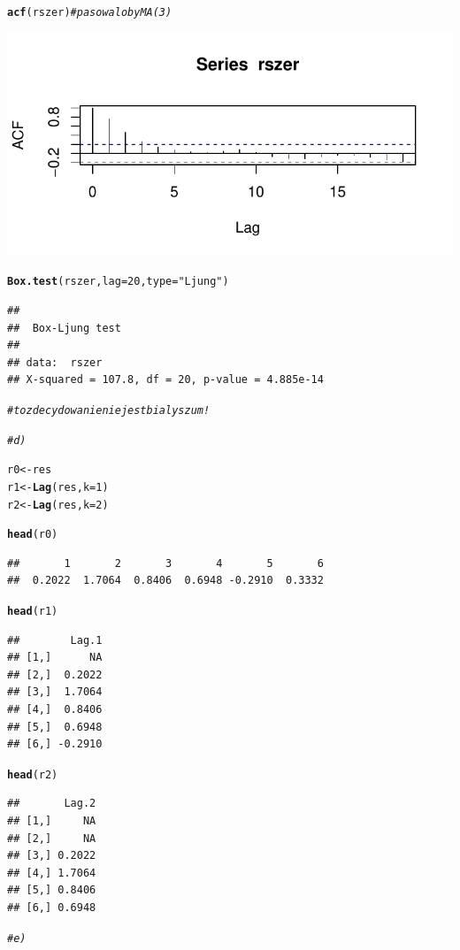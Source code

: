 \documentclass[10pt,a4paper,noindentfirst]{article}\usepackage[]{graphicx}\usepackage[]{color}
\makeatletter
\def\maxwidth{ %
  \ifdim\Gin@nat@width>\linewidth
    \linewidth
  \else
    \Gin@nat@width
  \fi
}
\newcommand{\hlnum}[1]{\textcolor[rgb]{0.686,0.059,0.569}{#1}}%
\newcommand{\hlstr}[1]{\textcolor[rgb]{0.192,0.494,0.8}{#1}}%
\newcommand{\hlcom}[1]{\textcolor[rgb]{0.678,0.584,0.686}{\textit{#1}}}%
\newcommand{\hlstd}[1]{\textcolor[rgb]{0.345,0.345,0.345}{#1}}%
\newcommand{\hlkwb}[1]{\textcolor[rgb]{0.69,0.353,0.396}{#1}}%
\newcommand{\hlkwc}[1]{\textcolor[rgb]{0.333,0.667,0.333}{#1}}%
\newcommand{\hlkwd}[1]{\textcolor[rgb]{0.737,0.353,0.396}{\textbf{#1}}}%
\newenvironment{kframe}{%
 \def\at@end@of@kframe{}%
 \ifinner\ifhmode%
  \def\at@end@of@kframe{\end{minipage}}%
  \begin{minipage}{\columnwidth}%
 \fi\fi%
 \def\FrameCommand##1{\hskip\@totalleftmargin \hskip-\fboxsep
 \colorbox{shadecolor}{##1}\hskip-\fboxsep
     \hskip-\linewidth \hskip-\@totalleftmargin \hskip\columnwidth}%
 \MakeFramed {\advance\hsize-\width
   \@totalleftmargin\z@ \linewidth\hsize
   \@setminipage}}%
 {\par\unskip\endMakeFramed%
 \at@end@of@kframe}
\newenvironment{knitrout}{}{} %
\makeatother
\begin{document}
\begin{knitrout}
{}


\begin{kframe}\begin{alltt}
\hlkwd{acf}\hlstd{(rszer)}   \hlcom{# pasowaloby MA(3)}
\end{alltt}
\end{kframe}

{\centering \includegraphics[width=\maxwidth]{figure/unnamed-chunk-43} 

}


\begin{kframe}\begin{alltt}
\hlkwd{Box.test}\hlstd{(rszer,} \hlkwc{lag} \hlstd{=} \hlnum{20}\hlstd{,} \hlkwc{type}\hlstd{=}\hlstr{"Ljung"}\hlstd{)}
\end{alltt}
\begin{verbatim}
## 
## 	Box-Ljung test
## 
## data:  rszer
## X-squared = 107.8, df = 20, p-value = 4.885e-14
\end{verbatim}
\begin{alltt}
\hlcom{# to zdecydowanie nie jest bialy szum!}

\hlcom{# d)}

\hlstd{r0} \hlkwb{<-} \hlstd{res}
\hlstd{r1} \hlkwb{<-} \hlkwd{Lag}\hlstd{(res,}\hlkwc{k}\hlstd{=}\hlnum{1}\hlstd{)}
\hlstd{r2} \hlkwb{<-} \hlkwd{Lag}\hlstd{(res,}\hlkwc{k}\hlstd{=}\hlnum{2}\hlstd{)}

\hlkwd{head}\hlstd{(r0)}
\end{alltt}
\begin{verbatim}
##       1       2       3       4       5       6 
##  0.2022  1.7064  0.8406  0.6948 -0.2910  0.3332
\end{verbatim}
\begin{alltt}
\hlkwd{head}\hlstd{(r1)}
\end{alltt}
\begin{verbatim}
##        Lag.1
## [1,]      NA
## [2,]  0.2022
## [3,]  1.7064
## [4,]  0.8406
## [5,]  0.6948
## [6,] -0.2910
\end{verbatim}
\begin{alltt}
\hlkwd{head}\hlstd{(r2)}
\end{alltt}
\begin{verbatim}
##       Lag.2
## [1,]     NA
## [2,]     NA
## [3,] 0.2022
## [4,] 1.7064
## [5,] 0.8406
## [6,] 0.6948
\end{verbatim}
\begin{alltt}
\hlcom{# e)}


\end{alltt}
\end{kframe}
\end{knitrout}
\end{document}
